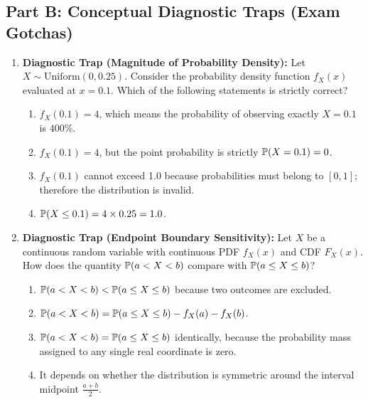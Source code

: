 \subsection*{Part B: Conceptual Diagnostic Traps (Exam Gotchas)}

\begin{enumerate}[resume]
\item \textbf{Diagnostic Trap (Magnitude of Probability Density):}
Let $X \sim \text{Uniform}(0, 0.25)$. Consider the probability density function $f_X(x)$ evaluated at $x = 0.1$. Which of the following statements is strictly correct?
\begin{enumerate}
    \item $f_X(0.1) = 4$, which means the probability of observing exactly $X = 0.1$ is $400\%$.
    \item $f_X(0.1) = 4$, but the point probability is strictly $\P(X = 0.1) = 0$.
    \item $f_X(0.1)$ cannot exceed 1.0 because probabilities must belong to $[0, 1]$; therefore the distribution is invalid.
    \item $\P(X \le 0.1) = 4 \times 0.25 = 1.0$.
\end{enumerate}

\item \textbf{Diagnostic Trap (Endpoint Boundary Sensitivity):}
Let $X$ be a continuous random variable with continuous PDF $f_X(x)$ and CDF $F_X(x)$. How does the quantity $\P(a < X < b)$ compare with $\P(a \le X \le b)$?
\begin{enumerate}
    \item $\P(a < X < b) < \P(a \le X \le b)$ because two outcomes are excluded.
    \item $\P(a < X < b) = \P(a \le X \le b) - f_X(a) - f_X(b)$.
    \item $\P(a < X < b) = \P(a \le X \le b)$ identically, because the probability mass assigned to any single real coordinate is zero.
    \item It depends on whether the distribution is symmetric around the interval midpoint $\frac{a+b}{2}$.
\end{enumerate}
\end{enumerate}
